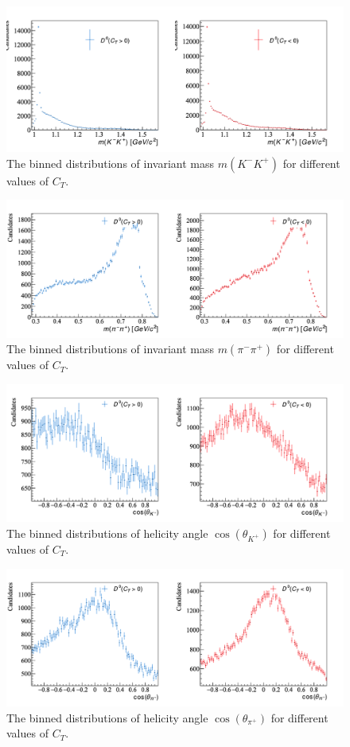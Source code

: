 \begin{figure}[h]
\center
\includegraphics*[width=0.96\linewidth]{CM_variables_D0/invmass_KmKp}
\caption{The binned distributions of invariant mass $m(K^-K^+)$ for different values of $C_T$.}
\label{invkk}
\end{figure}
\begin{figure}[h]
\center
\includegraphics*[width=0.96\linewidth]{CM_variables_D0/invmass_PimPip}
\caption{The binned distributions of invariant mass $m(\pi^-\pi^+)$ for different values of $C_T$.}
\label{invpipi}
\end{figure}
\begin{figure}[h]
\center
\includegraphics*[width=0.96\linewidth]{CM_variables_D0/helangle_KmKp}
\caption{The binned distributions of helicity angle $\cos(\theta_{K^+})$ for different values of $C_T$.}
\label{thetakk}
\end{figure}
\begin{figure}[h]
\center
\includegraphics*[width=0.96\linewidth]{CM_variables_D0/helangle_PimPip}
\caption{The binned distributions of helicity angle $\cos(\theta_{\pi^+})$ for different values of $C_T$.}
\label{thetapipi}
\end{figure}
